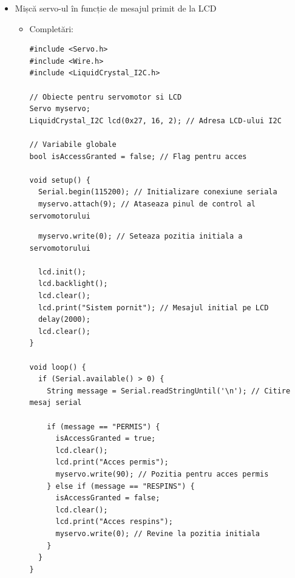 \documentclass{report}
\begin{document}
\begin{itemize}
\begin{itemize}
    \end{itemize}
    \item Mișcă servo-ul în funcție de mesajul primit de la LCD
    \begin{itemize}
        \item Completări: 
        \begin{lstlisting}
#include <Servo.h>
#include <Wire.h>
#include <LiquidCrystal_I2C.h>

// Obiecte pentru servomotor si LCD
Servo myservo;
LiquidCrystal_I2C lcd(0x27, 16, 2); // Adresa LCD-ului I2C

// Variabile globale
bool isAccessGranted = false; // Flag pentru acces

void setup() {
  Serial.begin(115200); // Initializare conexiune seriala
  myservo.attach(9); // Ataseaza pinul de control al servomotorului
\end{lstlisting}
\newpage
\vspace*{1cm}
\begin{lstlisting}
  myservo.write(0); // Seteaza pozitia initiala a servomotorului

  lcd.init();
  lcd.backlight();
  lcd.clear();
  lcd.print("Sistem pornit"); // Mesajul initial pe LCD
  delay(2000);
  lcd.clear();
}

void loop() {
  if (Serial.available() > 0) {
    String message = Serial.readStringUntil('\n'); // Citire mesaj serial

    if (message == "PERMIS") {
      isAccessGranted = true;
      lcd.clear();
      lcd.print("Acces permis");
      myservo.write(90); // Pozitia pentru acces permis
    } else if (message == "RESPINS") {
      isAccessGranted = false;
      lcd.clear();
      lcd.print("Acces respins");
      myservo.write(0); // Revine la pozitia initiala
    }
  }
}

        \end{lstlisting}
        
    \end{itemize}
    
\end{itemize}
\end{document}
